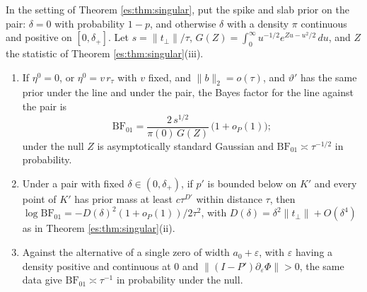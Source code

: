 \begin{theorem}\label{es:thm:bf}
In the setting of Theorem \ref{es:thm:singular}, put the spike and slab prior on the pair: $\delta=0$ with probability $1-p$, and otherwise $\delta$ with a density $\pi$ continuous and positive on $[0,\delta_+]$. Let $s=\|t_\perp\|/\tau$, $G(Z)=\int_0^\infty u^{-1/2}e^{Zu-u^2/2}\,du$, and $Z$ the statistic of Theorem \ref{es:thm:singular}(iii).
\begin{enumerate}
\item[(a)] If $\eta^0=0$, or $\eta^0=v\,r_\tau$ with $v$ fixed, and $\|b\|_2=o(\tau)$, and $\vartheta'$ has the same prior under the line and under the pair, the Bayes factor for the line against the pair is
\[
\mathrm{BF}_{01}=\frac{2\,s^{1/2}}{\pi(0)\,G(Z)}\,\bigl(1+o_P(1)\bigr);
\]
under the null $Z$ is asymptotically standard Gaussian and $\mathrm{BF}_{01}\asymp\tau^{-1/2}$ in probability.
\item[(b)] Under a pair with fixed $\delta\in(0,\delta_+)$, if $p'$ is bounded below on $K'$ and every point of $K'$ has prior mass at least $c\tau^{D'}$ within distance $\tau$, then $\log\mathrm{BF}_{01}=-D(\delta)^2(1+o_P(1))/2\tau^2$, with $D(\delta)=\delta^2\|t_\perp\|+O(\delta^4)$ as in Theorem \ref{es:thm:singular}(ii).
\item[(c)] Against the alternative of a single zero of width $a_0+\varepsilon$, with $\varepsilon$ having a density positive and continuous at $0$ and $\|(I-P')\partial_\varepsilon\Phi\|>0$, the same data give $\mathrm{BF}_{01}\asymp\tau^{-1}$ in probability under the null.
\end{enumerate}
\end{theorem}

